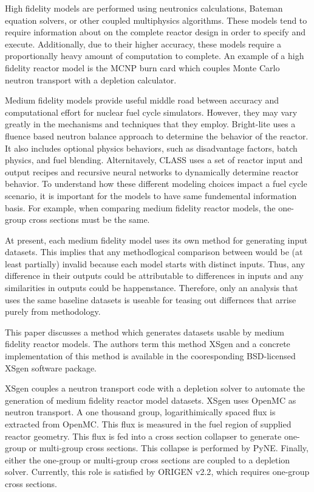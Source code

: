 \documentclass{article}
\begin{document}
High fidelity models are performed using neutronics calculations, Bateman
equation solvers\cite{bateman1910, bateman}, or other coupled multiphysics algorithms. These models tend
to require information about on the complete reactor design in order to specify and execute.
Additionally, due to their higher accuracy, these models require a proportionally heavy amount
of computation to complete. An example of a high fidelity reactor model is the
MCNP\cite{mcnp5monte} burn card which couples Monte Carlo neutron transport with a depletion
calculator.

Medium fidelity models provide useful middle road between accuracy and computational effort
for nuclear fuel cycle simulators. However, they may vary greatly in the mechanisms and
techniques that they employ. Bright-lite uses a fluence based neutron balance approach to
determine the behavior of the reactor. It also includes optional physics behaviors, such as
disadvantage factors, batch physics, and fuel blending. Alternitavely, CLASS uses a set of
reactor input and output recipes and recursive neural networks\cite{classneural} to dynamically determine
reactor behavior. To understand how these different modeling choices impact a fuel cycle
scenario, it is important for the models to have same fundemental information basis.
For example, when comparing medium fidelity reactor models, the one-group cross sections
must be the same.

At present, each medium fidelity model uses its own method for generating input datasets.
This implies that any methodlogical comparison between would be (at least partially) invalid
because each model starts with distinct inputs. Thus, any difference in their outputs
could be attributable to differences in inputs and any similarities in outputs could be
happenstance. Therefore, only an analysis that uses the same baseline datasets
is useable for teasing out differnces that arrise purely from methodology.

This paper discusses a method which generates datasets usable by medium fidelity reactor models.
The authors term this method XSgen and a concrete implementation of this method is available
in the cooresponding BSD-licensed XSgen software package.

XSgen couples a neutron transport code with a depletion solver to automate the generation of
medium fidelity reactor model datasets. XSgen uses OpenMC\cite{openmc} as neutron transport.
A one thousand group, logarithimically spaced flux is extracted from OpenMC. This flux is
measured in the fuel region of supplied reactor geometry. This flux is fed into a cross
section collapser to generate one-group or multi-group cross sections. This collapse is
performed by PyNE\cite{pyne}. Finally, either the
one-group or multi-group cross sections are coupled to a depletion solver. Currently, this
role is satisfied by ORIGEN v2.2\cite{origen2}, which requires one-group cross sections.
\end{document}
